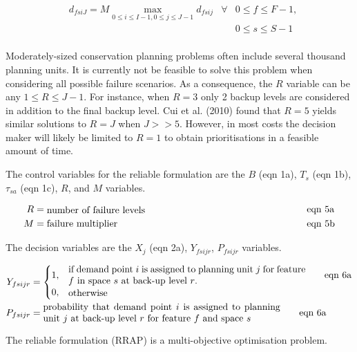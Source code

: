 \documentclass[11pt,]{article}
\begin{document}
\begin{align*}
& d_{fsiJ} = M \max\limits_{0 \leq i \leq I-1, 0 \leq j \leq J-1} d_{fsij} & \forall & 0 \leq f \leq F-1, \tag*{eqn 4} \\
& & & 0 \leq s \leq S-1\\
\end{align*}

Moderately-sized conservation planning problems often include several
thousand planning units. It is currently not be feasible to solve this
problem when considering all possible failure scenarios. As a
consequence, the $R$ variable can be any $1 \leq R \leq J-1$. For
instance, when $R=3$ only 2 backup levels are considered in addition to
the final backup level. Cui et al. (2010) found that $R=5$ yields
similar solutions to $R=J$ when $J >> 5$. However, in most costs the
decision maker will likely be limited to $R=1$ to obtain prioritisations
in a feasible amount of time.

The control variables for the reliable formulation are the $B$ (eqn 1a),
$T_{s}$ (eqn 1b), $\tau_{sa}$ (eqn 1c), $R$, and $M$ variables.

\begin{align*}
R &= \parbox{25em}{number of failure levels} \tag*{eqn 5a} \\
%
M &= \parbox{25em}{failure multiplier} \tag*{eqn 5b}\\
%
\end{align*}

The decision variables are the $X_j$ (eqn 2a), $Y_{fsijr}$, $P_{fsijr}$
variables.

\begin{align*}
Y_{fsijr} &= \begin{cases}
        1, & \parbox{25em}{if demand point $i$ is assigned to planning unit $j$ for feature $f$ in space $s$ at back-up level $r$. } \tag*{eqn 6a} \\
        0, & \parbox{25em}{otherwise} \\
    \end{cases} \\
%
P_{fsijr} &= \parbox{25em}{probability that demand point $i$ is assigned to planning unit $j$ at back-up level $r$ for feature $f$ and space $s$} \tag*{eqn 6a}\\
%
\end{align*}

The reliable formulation (RRAP) is a multi-objective optimisation
problem.
\end{document}
